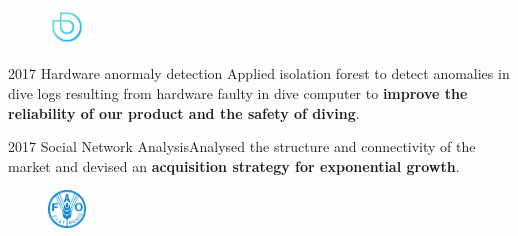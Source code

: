 \documentclass{tccv}
\begin{document}
\begin{figure}[h!] %
  \centering
  \includegraphics[width=1cm,height=1cm]{../company_icon/deepblu.jpg}
\end{figure}

\begin{yearlist}

  \item{2017} {Hardware anormaly detection} {Applied isolation forest to detect
    anomalies in dive logs resulting from hardware faulty in dive
    computer to \textbf{improve the reliability of our product and the
      safety of diving}.}

  \item{2017} {Social Network Analysis}{Analysed the structure and
    connectivity of the market and devised an \textbf{acquisition
      strategy for exponential growth}.}
    
\end{yearlist}


\begin{figure}[h!] %
  \centering
  \includegraphics[width=1cm,height=1cm]{../company_icon/fao.png}
\end{figure}
\end{document}
